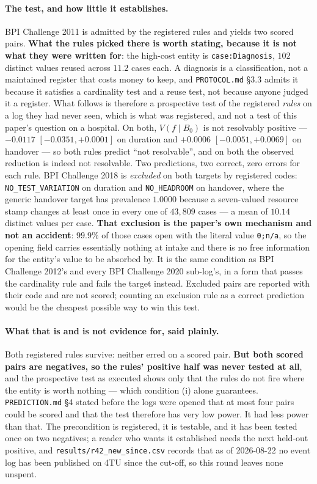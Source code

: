 \documentclass[preprint,12pt]{elsarticle}
\begin{document}
\paragraph{The test, and how little it establishes.} BPI Challenge 2011 is
admitted by the registered rules and yields two scored pairs. \textbf{What the
rules picked there is worth stating, because it is not what they were written
for}: the high-cost entity is \texttt{case:Diagnosis}, $102$ distinct values
reused across $11.2$ cases each. A diagnosis is a classification, not a
maintained register that costs money to keep, and \texttt{PROTOCOL.md} \S3.3
admits it because it satisfies a cardinality test and a reuse test, not
because anyone judged it a register. What follows is therefore a prospective
test of the registered \emph{rules} on a log they had never seen, which is
what was registered, and not a test of this paper's question on a hospital.
On both,
$V(f \mid B_0)$ is not resolvably positive --- $-0.0117$
$[-0.0351,+0.0001]$ on duration and $+0.0006$ $[-0.0051,+0.0069]$ on handover
--- so both rules predict ``not resolvable'', and on both the observed
reduction is indeed not resolvable. Two predictions, two correct, zero errors
for each rule. BPI Challenge 2018 is \emph{excluded} on both targets by
registered codes: \texttt{NO\_TEST\_VARIATION} on duration and
\texttt{NO\_HEADROOM} on handover, where the generic handover target has
prevalence $1.0000$ because a seven-valued resource stamp changes at least
once in every one of $43{,}809$ cases --- a mean of $10.14$ distinct values
per case. \textbf{That exclusion is the paper's own mechanism and not an
accident}: $99.9\%$ of those cases open with the literal value
\texttt{0;n/a}, so the opening field carries essentially nothing at intake and
there is no free information for the entity's value to be absorbed by. It is
the same condition as BPI Challenge 2012's and every BPI Challenge 2020
sub-log's, in a form that passes the cardinality rule and fails the target
instead. Excluded pairs are reported with their
code and are not scored; counting an exclusion rule as a correct prediction
would be the cheapest possible way to win this test.

\paragraph{What that is and is not evidence for, said plainly.} Both
registered rules survive: neither erred on a scored pair.
\textbf{But both scored pairs are negatives, so the rules' positive half was
never tested at all}, and the prospective test as executed shows only that the
rules do not fire where the entity is worth nothing --- which condition (i)
alone guarantees. \texttt{PREDICTION.md} \S4 stated before the logs were
opened that at most four pairs could be scored and that the test therefore has
very low power. It had less power than that. The precondition is registered,
it is testable, and it has been tested once on two negatives; a reader who
wants it established needs the next held-out positive, and
\texttt{results/r42\_new\_since.csv} records that as of 2026-08-22 no event
log has been published on 4TU since the cut-off, so this round leaves none
unspent.
\end{document}
